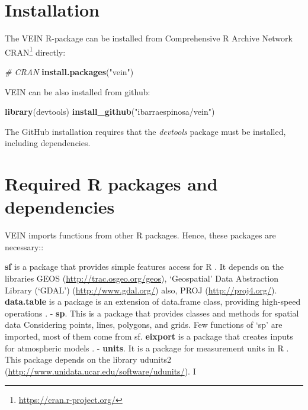 \documentclass[12pt,graybox,envcountchap,sectrefs]{krantz}
\makeatletter
\newenvironment{Shaded}{\begin{snugshade}}{\end{snugshade}}
\newcommand{\KeywordTok}[1]{\textcolor[rgb]{0.13,0.29,0.53}{\textbf{#1}}}
\newcommand{\StringTok}[1]{\textcolor[rgb]{0.31,0.60,0.02}{#1}}
\newcommand{\CommentTok}[1]{\textcolor[rgb]{0.56,0.35,0.01}{\textit{#1}}}
\newcommand{\NormalTok}[1]{#1}
\renewcommand{\href}[2]{#2\footnote{\url{#1}}}
\newenvironment{kframe}{%
\medskip{}
\setlength{\fboxsep}{.8em}
 \def\at@end@of@kframe{}%
 \ifinner\ifhmode%
  \def\at@end@of@kframe{\end{minipage}}%
  \begin{minipage}{\columnwidth}%
 \fi\fi%
 \def\FrameCommand##1{\hskip\@totalleftmargin \hskip-\fboxsep
 \colorbox{shadecolor}{##1}\hskip-\fboxsep
     \hskip-\linewidth \hskip-\@totalleftmargin \hskip\columnwidth}%
 \MakeFramed {\advance\hsize-\width
   \@totalleftmargin\z@ \linewidth\hsize
   \@setminipage}}%
 {\par\unskip\endMakeFramed%
 \at@end@of@kframe}
\renewenvironment{Shaded}{\begin{kframe}}{\end{kframe}}
\theoremstyle{definition}
\theoremstyle{definition}
\theoremstyle{definition}
\theoremstyle{remark}
\makeatother
\begin{document}
\section{Installation}\label{installation}

The VEIN R-package can be installed from Comprehensive R Archive Network
\href{https://cran.r-project.org/}{CRAN} directly:

\begin{Shaded}
\begin{Highlighting}[]
\CommentTok{# CRAN}
\KeywordTok{install.packages}\NormalTok{(}\StringTok{"vein"}\NormalTok{)}
\end{Highlighting}
\end{Shaded}

VEIN can be also installed from github:

\begin{Shaded}
\begin{Highlighting}[]
\KeywordTok{library}\NormalTok{(devtools)}
\KeywordTok{install_github}\NormalTok{(}\StringTok{"ibarraespinosa/vein"}\NormalTok{)}
\end{Highlighting}
\end{Shaded}

The GitHub installation requires that the \emph{devtools} package
\citep{devtools} must be installed, including dependencies.

\section{Required R packages and
dependencies}\label{required-r-packages-and-dependencies}

VEIN imports functions from other R packages. Hence, these packages are
necessary::

\textbf{sf} is a package that provides simple features access for R
\citep{sf}. It depends on the libraries GEOS
(\url{http://trac.osgeo.org/geos}), `Geospatial' Data Abstraction
Library (`GDAL') (\url{http://www.gdal.org/}) also, PROJ
(\url{http://proj4.org/}). \textbf{data.table} is a package is an
extension of data.frame class, providing high-speed operations
\citep{datatable}. - \textbf{sp}. This is a package that provides
classes and methods for spatial data \citep{sp} Considering points,
lines, polygons, and grids. Few functions of `sp' are imported, most of
them come from sf. \textbf{eixport} is a package \citep{eixport2} that
creates inputs for atmospheric models \citep{eixport}. - \textbf{units}.
It is a package for measurement units in R \citep{units}. This package
depends on the library udunits2
(\url{http://www.unidata.ucar.edu/software/udunits/}). I
\end{document}
